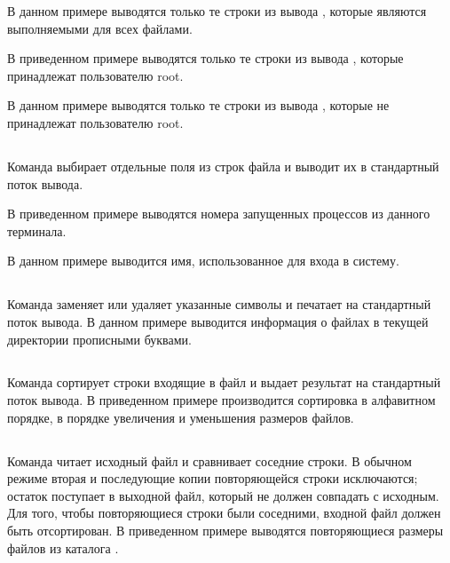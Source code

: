 В данном примере выводятся только те строки из вывода , которые являются выполняемыми для всех файлами.


В приведенном примере выводятся только те строки из вывода , которые принадлежат пользователю root.


В данном примере выводятся только те строки из вывода , которые не принадлежат пользователю root.


\subsection{}

Команда  выбирает отдельные поля из строк файла и выводит их в стандартный поток вывода.

В приведенном примере выводятся номера запущенных процессов из данного терминала. 


В данном примере выводится имя, использованное для входа в систему.


\subsection{}

Команда  заменяет или удаляет указанные символы и печатает на стандартный поток вывода. В данном примере выводится информация о файлах в текущей директории прописными буквами.


\subsection{}

Команда  сортирует строки входящие в файл и выдает результат на стандартный поток вывода. В приведенном примере производится сортировка в алфавитном порядке, в порядке увеличения и уменьшения размеров файлов.


\subsection{}

Команда  читает исходный файл и сравнивает соседние строки. В обычном режиме вторая и последующие копии повторяющейся строки исключаются; остаток поступает в выходной файл, который не должен совпадать с исходным. Для того, чтобы повторяющиеся строки были соседними, входной файл должен быть отсортирован. В приведенном примере выводятся повторяющиеся размеры файлов из каталога . 


